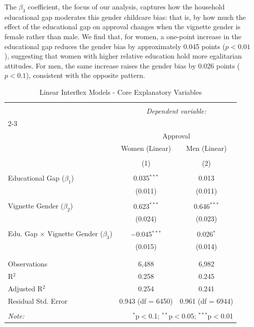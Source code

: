 \documentclass[12pt,letterpaper]{article}
\begin{document}
\noindent The $\beta_3$ coefficient, the focus of our analysis, captures how the household educational gap moderates this gender childcare bias: that is, by how much the effect of the educational gap on approval changes when the vignette gender is female rather than male. We find that, for women, a one-point increase in the educational gap reduces the gender bias by approximately 0.045 points ($p < 0.01$), suggesting that women with higher relative education hold more egalitarian attitudes. For men, the same increase raises the gender bias by 0.026 points ($p < 0.1$), consistent with the opposite pattern. 

\begin{table}[H] \centering 
	\caption{Linear Interflex Models - Core Explanatory Variables} 
	\label{} 
	\begin{tabular}{@{\extracolsep{5pt}}lcc} 
		\\[-1.8ex]\hline 
		\hline \\[-1.8ex] 
		& \multicolumn{2}{c}{\textit{Dependent variable:}} \\ 
		\cline{2-3} 
		\\[-1.8ex] & \multicolumn{2}{c}{Approval} \\ 
		& Women (Linear) & Men (Linear) \\ 
		\\[-1.8ex] & (1) & (2)\\ 
		\hline \\[-1.8ex] 
		Educational Gap ($\beta_1$) & 0.035$^{***}$ & 0.013 \\ 
		& (0.011) & (0.011) \\ 
		& & \\ 
		Vignette Gender ($\beta_2$) & 0.623$^{***}$ & 0.646$^{***}$ \\ 
		& (0.024) & (0.023) \\ 
		& & \\ 
		Edu. Gap $\times$ Vignette Gender ($\beta_3$) & $-$0.045$^{***}$ & 0.026$^{*}$ \\ 
		& (0.015) & (0.014) \\ 
		& & \\ 
		\hline \\[-1.8ex] 
		Observations & 6,488 & 6,982 \\ 
		R$^{2}$ & 0.258 & 0.245 \\ 
		Adjusted R$^{2}$ & 0.254 & 0.241 \\ 
		Residual Std. Error & 0.943 (df = 6450) & 0.961 (df = 6944) \\ 
		\hline 
		\hline \\[-1.8ex] 
		\textit{Note:}  & \multicolumn{2}{r}{$^{*}$p$<$0.1; $^{**}$p$<$0.05; $^{***}$p$<$0.01} \\ 
	\end{tabular} 
	\label{Tab:Linear_Interflex}
\end{table} 
\end{document}
